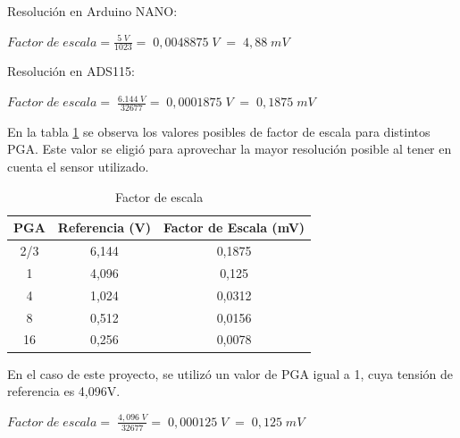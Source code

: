 Resolución en Arduino NANO:
\begin{center}
	\begin{math}Factor\;de\;escala=\frac{5\;V}{1023}=\;0,0048875\;V\;=\;4,88\;mV
	\end{math}
\end{center}

Resolución en ADS115:
\begin{center}
	\begin{math}Factor\;de\;escala=\;\frac{6.144\;V}{32677}=\;0,0001875\;V\;=\;0,1875\;mV
	\end{math}
\end{center}

En la tabla \ref{tab:Reso} se observa los valores posibles de factor de escala para distintos PGA. Este valor se eligió para aprovechar la mayor resolución posible al tener en cuenta el sensor utilizado.
\begin{table}[h]
	\centering
	\begin{tabular}{|c|c|c|}
		\hline
		\textbf{PGA} & \textbf{Referencia (V)} & \textbf{Factor de Escala (mV)} \\ \hline
		2/3          & 6,144                   & 0,1875                         \\ \hline
		1            & 4,096                   & 0,125                          \\ \hline
		4            & 1,024                   & 0,0312                         \\ \hline
		8            & 0,512                   & 0,0156                         \\ \hline
		16           & 0,256                   & 0,0078                         \\ \hline
	\end{tabular}
\caption{Factor de escala}
\label{tab:Reso}
\end{table}

En el caso de este proyecto, se utilizó un valor de PGA igual a 1, cuya tensión de referencia es 4,096V.
\begin{center}
	\begin{math}
		Factor\;de\;escala=\;\frac{4,096\;V}{32677}=\;0,000125\;V\;=\;0,125\;mV
	\end{math}
\end{center}


